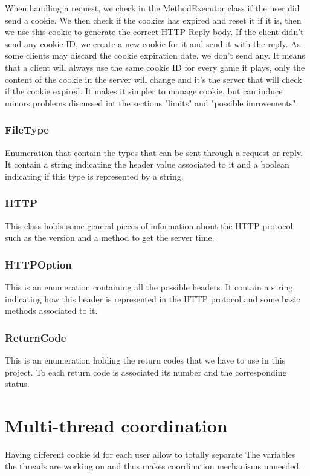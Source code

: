 \documentclass[11pt]{article}
\begin{document}
When handling a request, we check in the MethodExecutor class if the user did send a cookie. We then check if the cookies has expired and reset it if it is, then we use this cookie to generate the correct HTTP Reply body. If the client didn't send any cookie ID, we create a new cookie for it and send it with the reply. As some clients may discard the cookie expiration date, we don't send any. It means that a client will always use the same cookie ID for every game it plays, only the content of the cookie in the server will change and it's the server that will check if the cookie expired. It makes it simpler to manage cookie, but can induce minors problems discussed int the sections "limits" and "possible imrovements". 

\subsubsection{FileType}
Enumeration that contain the types that can be sent through a request or reply. It contain a string indicating the header value associated to it and a boolean indicating if this type is represented by a string.

\subsubsection{HTTP}
This class holds some general pieces of information about the HTTP protocol such as the version and a method to get the server time.

\subsubsection{HTTPOption}
This is an enumeration containing all the possible headers. It contain a string indicating how this header is represented in the HTTP protocol and some basic methods associated to it.

\subsubsection{ReturnCode}
This is an enumeration holding the return codes that we have to use in this project. To each return code is associated its number and the corresponding status.

\section{Multi-thread coordination}
Having different cookie id for each user allow to totally separate The variables the threads are working on and thus makes coordination mechanisms unneeded.
\end{document}
